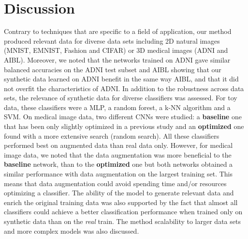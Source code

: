 \documentclass[10pt,journal,compsoc]{IEEEtran}
\begin{document}

\section{Discussion}

Contrary to techniques that are specific to a field of application, our method produced relevant data for diverse data sets including 2D natural images (MNIST, EMNIST, Fashion and CIFAR) or 3D medical images (ADNI and AIBL). Moreover, we noted that the networks trained on ADNI gave similar balanced accuracies on the ADNI test subset and AIBL showing that our synthetic data learned on ADNI benefit in the same way AIBL, and that it did not overfit the characteristics of ADNI. In addition to the robustness across data sets, the relevance of synthetic data for diverse classifiers was assessed. For toy data, these classifiers were a MLP, a random forest, a k-NN algorithm and a SVM. On medical image data, two different CNNs were studied: a \textbf{baseline} one that has been only slightly optimized in a previous study and an \textbf{optimized} one found with a more extensive search (random search). All these classifiers performed best on augmented data than real data only. However, for medical image data, we noted that the data augmentation was more beneficial to the \textbf{baseline} network, than to the \textbf{optimized} one but both networks obtained a similar performance with data augmentation on the largest training set. This means that data augmentation could avoid spending time and/or resources optimizing a classifier. The ability of the model to generate relevant data and enrich the original training data was also supported by the fact that almost all classifiers could achieve a better classification performance when trained only on synthetic data than on the \emph{real} train. The method scalability to larger data sets and more complex models was also discussed. 



\end{document}
